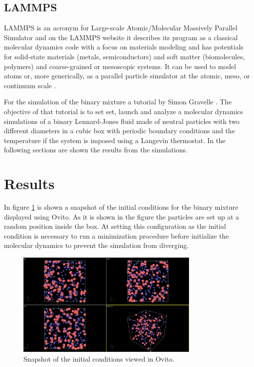\documentclass[main.tex]{subfiles}
\begin{document}
\subsection{LAMMPS}

LAMMPS is an acronym for Large-scale Atomic/Molecular Massively Parallel Simulator and on the LAMMPS website it describes its program as a classical molecular dynamics code with a focus on materials modeling and  has potentials for solid-state materials (metals, semiconductors) and soft matter (biomolecules, polymers) and coarse-grained or mesoscopic systems. 
It can be used to model atoms or, more generically, as a parallel particle simulator at the atomic, meso, or continuum scale \cite{LAMMPS}.

For the simulation of the binary mixture a tutorial by Simon Gravelle \cite{Gravelle}.
The objective of that tutorial is to set set, launch and analyze a molecular dynamics simulations of a binary Lennard-Jones fluid made of neutral particles with two different diameters in a cubic box with periodic boundary conditions and the temperature if the system is imposed using a Langevin thermostat.
In the following sections are shown the results from the simulations.

\section{Results}

In figure \ref{fig:initialCondiitons} is shown a snapshot of the initial conditions for the binary mixture displayed using Ovito.
As it is shown in the figure the particles are set up at a random position inside the box.
At setting this configuration as the initial condition is necessary to run a minimization procedure before initialize the molecular dynamics to prevent the simulation from diverging.

\begin{figure}[ht]
    \centering
    \includegraphics[width=0.8\textwidth]{imgs/hw3/InitialConditions.png}
    \caption{Snapshot of the initial conditions viewed in Ovito.}
    \label{fig:initialCondiitons}
\end{figure}
\end{document}
